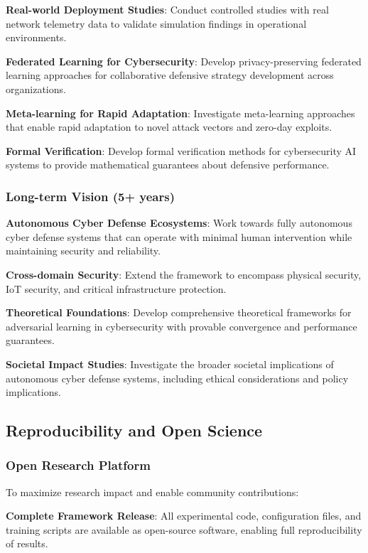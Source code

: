 \documentclass[11pt]{article}
\theoremstyle{definition}
\theoremstyle{plain}
\begin{document}
\textbf{Real-world Deployment Studies}: Conduct controlled studies with real network telemetry data to validate simulation findings in operational environments.

\textbf{Federated Learning for Cybersecurity}: Develop privacy-preserving federated learning approaches for collaborative defensive strategy development across organizations.

\textbf{Meta-learning for Rapid Adaptation}: Investigate meta-learning approaches that enable rapid adaptation to novel attack vectors and zero-day exploits.

\textbf{Formal Verification}: Develop formal verification methods for cybersecurity AI systems to provide mathematical guarantees about defensive performance.

\subsubsection{Long-term Vision (5+ years)}

\textbf{Autonomous Cyber Defense Ecosystems}: Work towards fully autonomous cyber defense systems that can operate with minimal human intervention while maintaining security and reliability.

\textbf{Cross-domain Security}: Extend the framework to encompass physical security, IoT security, and critical infrastructure protection.

\textbf{Theoretical Foundations}: Develop comprehensive theoretical frameworks for adversarial learning in cybersecurity with provable convergence and performance guarantees.

\textbf{Societal Impact Studies}: Investigate the broader societal implications of autonomous cyber defense systems, including ethical considerations and policy implications.

\subsection{Reproducibility and Open Science}

\subsubsection{Open Research Platform}
To maximize research impact and enable community contributions:

\textbf{Complete Framework Release}: All experimental code, configuration files, and training scripts are available as open-source software, enabling full reproducibility of results.
\end{document}
